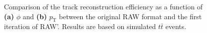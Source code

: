 \begin{figure}[h]
    \caption[Comparison of the track reconstruction efficiency as a function of $\phi$ and $p_\mathrm{T}$ between the original RAW format and the first iteration of RAW'.]{Comparison of the track reconstruction efficiency as a function of \textbf{(a)} $\phi$ and \textbf{(b)} $p_\mathrm{T}$ between the original RAW format and the first iteration of RAW'. Results are based on simulated $t\bar{t}$ events.} 
    \label{Figure:Chapter5_KsReconstruction}
\end{figure}
